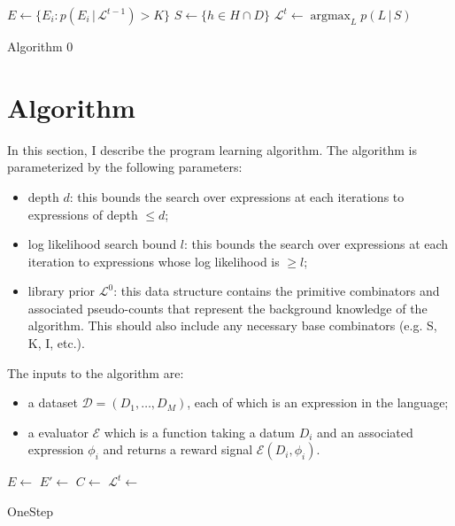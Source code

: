 \documentclass{article}
\DeclareMathOperator*{\argmax}{argmax}
\DeclareMathOperator*{\argmax}{arg\,max}
\begin{document}
\begin{minipage}{.7\linewidth}
  \begin{algorithm}[H]
    \SetAlgoLined 
    $E \leftarrow \{ E_i : p(E_i\, |\, \mathcal{L}^{t-1}) > K\}$\;
    $S \leftarrow \{ h \in H \cap D \}$\;
    $\mathcal{L}^t \leftarrow \argmax_L p(L \, | \, S)$
    \caption{Algorithm 0}
    \label{alg:short}
  \end{algorithm}
\end{minipage}


\section{Algorithm}
In this section, I describe the program learning algorithm. The
algorithm is parameterized by the following parameters: 

\begin{itemize}
\item depth $d$: this bounds the search over expressions at each
  iterations to expressions of depth $\leq d$;
\item log likelihood search bound $l$: this bounds the search over
  expressions at each iteration to expressions whose log likelihood is
  $\geq l$;
\item library prior $\mathcal{L}^0$: this data structure contains the
  primitive combinators and associated pseudo-counts that represent
  the background knowledge of the algorithm. This should also include
  any necessary base combinators (e.g. S, K, I, etc.).
\end{itemize}

The inputs to the algorithm are:
\begin{itemize}
\item a dataset $\mathcal{D} = (D_1, \dots, D_M)$, each of which is an
  expression in the language;
\item a evaluator $\mathcal{E}$ which is a function taking a datum
  $D_i$ and an associated expression $\phi_i$ and returns a reward
  signal $\mathcal{E}(D_i, \phi_i)$.
\end{itemize}

\begin{minipage}{.7\linewidth}
  \begin{algorithm}[H]
    \SetAlgoLined 
    $E \leftarrow $ \;
    $E' \leftarrow $ 
      \;
    $C \leftarrow$ \;
    $\mathcal{L}^t \leftarrow$ \;
    \caption{OneStep}
  \end{algorithm}
\end{minipage}
\end{document}
